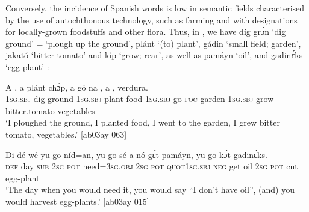 Conversely, the incidence of Spanish words is low in semantic fields characterised by the use of autochthonous technology, such as farming and with designations for locally-grown foodstuffs and other flora. Thus, in , we have díg grɔ́n ‘dig ground’ = ‘plough up the ground’, plánt ‘(to) plant’, gádin ‘small field; garden’, jakató ‘bitter tomato’ and kíp ‘grow; rear’, as well as pamáyn ‘oil’, and gadinɛ́ks ‘egg-plant’ :


\ea%
    \label{ex:key:1764}
    \gll A      ,  a    plánt  chɔ́p,  a    gó  na  ,
a        ,    verdura.\\
\textsc{1sg.sbj}  dig  ground  \textsc{1sg.sbj}  plant  food    \textsc{1sg.sbj}  go  \textsc{foc}  garden
\textsc{1sg.sbj}  grow  bitter.tomato  vegetables\\

\glt ‘I ploughed the ground, I planted food, I went to the garden, I grew bitter tomato, 
vegetables.’ [ab03ay 063]
\z


\ea%
    \label{ex:key:1765}
    \gll Di  dé  wé  yu  go  níd=an,    yu  go  sé  a    nó  gɛ́t
pamáyn,    yu  go  kɔ́t  gadinɛ́ks.\\
\textsc{def}  day  \textsc{sub}  \textsc{2sg}  \textsc{pot}  need=\textsc{3sg.obj}  \textsc{2sg}  \textsc{pot}  \textsc{quot1sg.sbj}  \textsc{neg}  get
oil      \textsc{2sg}  \textsc{pot}  cut  egg-plant\\

\glt ‘The day when you would need it, you would say “I don’t have oil”, 
(and) you would harvest egg-plants.’ [ab03ay 015]
\z

